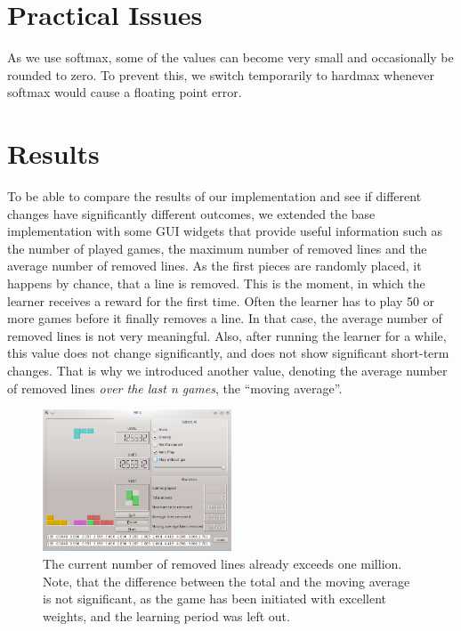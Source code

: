 \documentclass{ml}
\begin{document}
\section{Practical Issues}

As we use softmax, some of the values can become very small and occasionally be rounded to zero. 
To prevent this, we switch temporarily to hardmax whenever softmax would cause a floating point error.


\section{Results}
\label{results}

To be able to compare the results of our implementation and see if different changes have significantly different outcomes, we extended the base implementation with some GUI widgets that provide useful information such as the number of played games, the maximum number of removed lines and the average number of removed lines. As the first pieces are randomly placed, it happens by chance, that a line is removed. This is the moment, in which the learner receives a reward for the first time. Often the learner has to play 50 or more games  before it finally removes a line. In that case, the average number of removed lines is not very meaningful. Also, after running the learner for a while, this value does not change significantly, and does not show significant short-term changes. That is why we introduced another value, denoting the average number of removed lines \textit{over the last n games}, the ``moving average''.

\begin{figure}
  \vspace{-5pt}
  \begin{center}
    \includegraphics[width=0.5\textwidth]{img/three.png}
  \end{center}
  \vspace{-15pt}
  \caption{\footnotesize{The current number of removed lines already exceeds one million. Note, that the difference between the total and the moving average is not significant, as the game has been initiated with excellent weights, and the learning period was left out.}}
  \label{three}
  \vspace{-5pt}
\end{figure}
\end{document}
